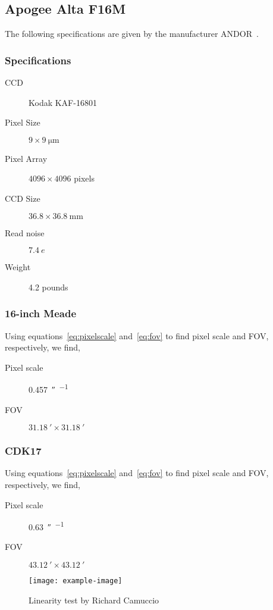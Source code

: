 \subsection{Apogee Alta F16M}
The following specifications are given by the manufacturer ANDOR~\cite{apogee}.
\subsubsection{Specifications}
\begin{description}
    \item[CCD] Kodak KAF-16801
    \item[Pixel Size] $9 \times \SI{9}{\micro\meter}$
    \item[Pixel Array] $4096 \times 4096$ pixels
    \item[CCD Size] $36.8 \times \SI{36.8}{\milli\meter}$
    \item[Read noise] $\SI{7.4}{\elementarycharge}$
    \item[Weight] 4.2 pounds
\end{description}


\subsubsection{16-inch Meade}
Using equations~\ref{eq:pixelscale} and~\ref{eq:fov} to find pixel scale and FOV, respectively, we find, 
\begin{description}
    \item[Pixel scale] \SI{0.457}{\arcsecond\per{}}
    \item[FOV] $\SI{31.18}{\arcminute} \times \SI{31.18}{\arcminute}$
\end{description}

\subsubsection{CDK17}
Using equations~\ref{eq:pixelscale} and~\ref{eq:fov} to find pixel scale and FOV, respectively, we find, 
\begin{description}
    \item[Pixel scale] \SI{0.63}{\arcsecond\per{}}
    \item[FOV] $\SI{43.12}{\arcminute} \times \SI{43.12}{\arcminute}$
\end{description}

\begin{figure}[h]
    \centering
    \texttt{[image: example-image]}
    \caption{Linearity test by Richard Camuccio}
\label{fig:linearity}
\end{figure}


